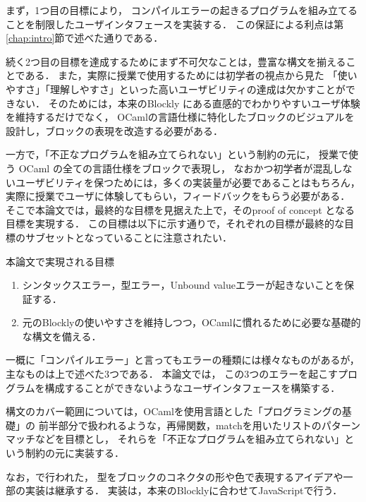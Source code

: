 まず，1つ目の目標により，
コンパイルエラーの起きるプログラムを組み立てることを制限したユーザインタフェースを実装する．
この保証による利点は第\ref{chap:intro}節で述べた通りである．

続く2つ目の目標を達成するためにまず不可欠なことは，豊富な構文を揃えることである．
また，実際に授業で使用するためには初学者の視点から見た
「使いやすさ」「理解しやすさ」といった高いユーザビリティの達成は欠かすことができない．
そのためには，本来のBlockly にある直感的でわかりやすいユーザ体験を維持するだけでなく，
OCamlの言語仕様に特化したブロックのビジュアルを設計し，ブロックの表現を改造する必要がある．

一方で，「不正なプログラムを組み立てられない」という制約の元に，
授業で使う OCaml の全ての言語仕様をブロックで表現し，
なおかつ初学者が混乱しないユーザビリティを保つためには，多くの実装量が必要であることはもちろん，
実際に授業でユーザに体験してもらい，フィードバックをもらう必要がある．
そこで本論文では，最終的な目標を見据えた上で，そのproof of concept となる目標を実現する．
この目標は以下に示す通りで，それぞれの目標が最終的な目標のサブセットとなっていることに注意されたい．
\begin{itembox}[l]{本論文で実現される目標}
  \begin {enumerate}
    \item シンタックスエラー，型エラー，Unbound valueエラーが起きないことを保証する．
    \item 元のBlocklyの使いやすさを維持しつつ，OCamlに慣れるために必要な基礎的な構文を備える．
  \end {enumerate}
\end{itembox}

一概に「コンパイルエラー」と言ってもエラーの種類には様々なものがあるが，主なものは上で述べた3つである．
本論文では，
この3つのエラーを起こすプログラムを構成することができないようなユーザインタフェースを構築する．

構文のカバー範囲については，OCamlを使用言語とした「プログラミングの基礎」\cite{AsaiBook}の
前半部分で扱われるような，再帰関数，matchを用いたリストのパターンマッチなどを目標とし，
それらを「不正なプログラムを組み立てられない」という制約の元に実装する．

なお，\cite{Typed-Blockly}で行われた，
型をブロックのコネクタの形や色で表現するアイデアや一部の実装は継承する．
実装は，本来のBlocklyに合わせてJavaScriptで行う．
